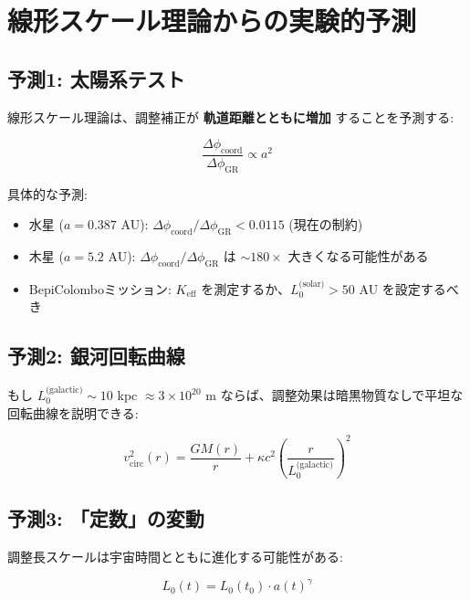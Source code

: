 \documentclass[11pt,a4paper]{article}
\begin{document}
	\section{線形スケール理論からの実験的予測}
	\label{sec:scale-predictions}
	
	\subsection{予測1: 太陽系テスト}
	
	線形スケール理論は、調整補正が \textbf{軌道距離とともに増加} することを予測する:
	
	\begin{equation}
		\frac{\Delta\phi_{\text{coord}}}{\Delta\phi_{\text{GR}}} \propto a^2
	\end{equation}
	
	具体的な予測:
	\begin{itemize}
		\item 水星 ($a = 0.387$ AU): $\Delta\phi_{\text{coord}}/\Delta\phi_{\text{GR}} < 0.0115$ (現在の制約)
		\item 木星 ($a = 5.2$ AU): $\Delta\phi_{\text{coord}}/\Delta\phi_{\text{GR}}$ は $\sim 180\times$ 大きくなる可能性がある
		\item BepiColomboミッション: $K_{\mathrm{eff}}$ を測定するか、$L_0^{\text{(solar)}} > 50$ AU を設定するべき
	\end{itemize}
	
	\subsection{予測2: 銀河回転曲線}
	
	もし $L_0^{\text{(galactic)}} \sim 10$ kpc $\approx 3\times10^{20}$ m ならば、調整効果は暗黒物質なしで平坦な回転曲線を説明できる:
	
	\begin{equation}
		v_{\text{circ}}^2(r) = \frac{GM(r)}{r} + \kappa c^2 \left(\frac{r}{L_0^{\text{(galactic)}}}\right)^2
	\end{equation}
	
	\subsection{予測3: 「定数」の変動}
	
	調整長スケールは宇宙時間とともに進化する可能性がある:
	
	\begin{equation}
		L_0(t) = L_0(t_0) \cdot a(t)^\gamma
	\end{equation}
	
\end{document}
